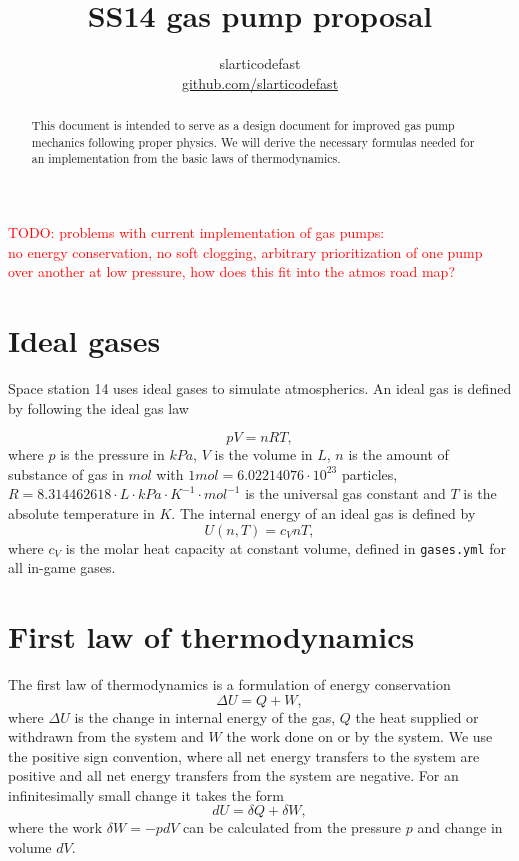 \documentclass[12pt,a4paper]{article}
\author{slarticodefast \\ \href{https://github.com/slarticodefast}{github.com/slarticodefast}}
\title{SS14 gas pump proposal}
\newcommand\todo[1]{\textcolor{red}{TODO: #1}}
\numberwithin{equation}{section}
\begin{document}
\maketitle
\begin{abstract}
	This document is intended to serve as a design document for improved gas pump mechanics following proper physics. We will derive the necessary formulas needed for an implementation from the basic laws of thermodynamics.
\end{abstract}

\todo{problems with current implementation of gas pumps: \\ no energy conservation, no soft clogging, arbitrary prioritization of one pump over another at low pressure, how does this fit into the atmos road map?}

\section{Ideal gases}

Space station 14 uses ideal gases to simulate atmospherics. An ideal gas is defined by following the ideal gas law

\begin{equation}
pV=nRT,
\end{equation}
where $p$ is the pressure in $kPa$, $V$ is the volume in $L$, $n$ is the amount of substance of gas in $mol$ with $1 mol=6.02214076 \cdot 10^{23}$ particles, $R = 8.314462618\cdot L \cdot kPa \cdot K^{-1} \cdot mol^{-1}$ is the universal gas constant and $T$ is the absolute temperature in $K$.
The internal energy of an ideal gas is defined by
\begin{equation}
U(n,T)=c_V n T,
\label{eqn:UcnT}
\end{equation}
where $c_V$ is the molar heat capacity at constant volume, defined in \texttt{gases.yml} for all in-game gases.

\section{First law of thermodynamics}
The first law of thermodynamics is a formulation of energy conservation
\begin{equation}
\Delta U = Q + W,
\end{equation}
where $\Delta U$ is the change in internal energy of the gas, $Q$ the heat supplied or withdrawn from the system and $W$ the work done on or by the system.
We use the positive sign convention, where all net energy transfers to the system are positive and all net energy transfers from the system are negative.
For an infinitesimally small change it takes the form
\begin{equation}
d U = \delta Q +\delta W,
\end{equation}
where the work $\delta W = -p dV$ can be calculated from the pressure $p$ and change in volume $dV$.
\end{document}
